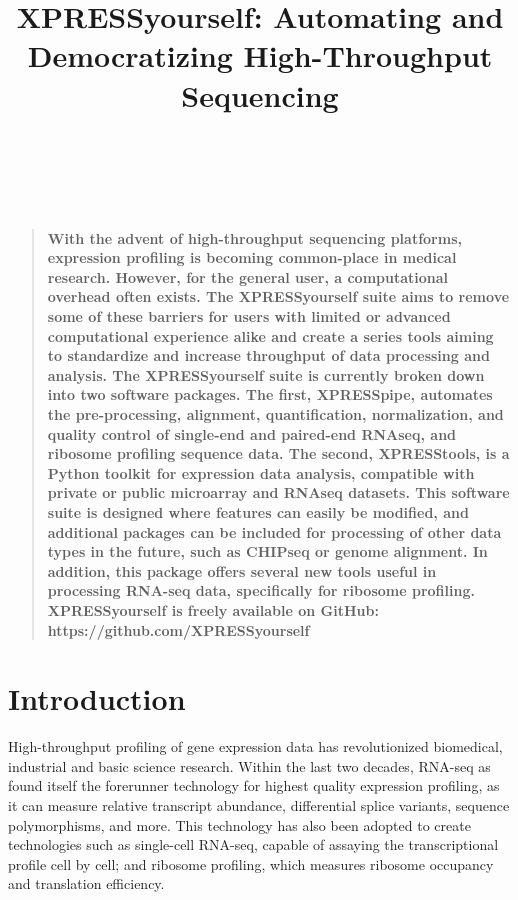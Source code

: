 \documentclass[11pt, a4paper, oneside]{article}
\title{
XPRESSyourself: Automating and Democratizing High-Throughput Sequencing
}
\author
{
\\
\\
}
\date{}
\newenvironment{sciabstract}{%
\begin{quote} \bf}
{\end{quote}}
\begin{document}
\baselineskip24pt

\maketitle





\begin{sciabstract}
With the advent of high-throughput sequencing platforms, expression profiling is becoming common-place in medical research. However, for the general user, a computational overhead often exists. The XPRESSyourself suite aims to remove some of these barriers for users with limited or advanced computational experience alike and create a series tools aiming to standardize and increase throughput of data processing and analysis. The XPRESSyourself suite is currently broken down into two software packages. The first, XPRESSpipe, automates the pre-processing, alignment, quantification, normalization, and quality control of single-end and paired-end RNAseq, and ribosome profiling sequence data. The second, XPRESStools, is a Python toolkit for expression data analysis, compatible with private or public microarray and RNAseq datasets. This software suite is designed where features can easily be modified, and additional packages can be included for processing of other data types in the future, such as CHIPseq or genome alignment. In addition, this package offers several new tools useful in processing RNA-seq data, specifically for ribosome profiling.
\newline\\
\normalfont XPRESSyourself is freely available on GitHub: https://github.com/XPRESSyourself\\
\end{sciabstract}


\section{Introduction}

High-throughput profiling of gene expression data has revolutionized biomedical, industrial and basic science research. Within the last two decades, RNA-seq as found itself the forerunner technology for highest quality expression profiling, as it can measure relative transcript abundance, differential splice variants, sequence polymorphisms, and more. This technology has also been adopted to create technologies such as single-cell RNA-seq, capable of assaying the transcriptional profile cell by cell; and ribosome profiling, which measures ribosome occupancy and translation efficiency.
\end{document}
